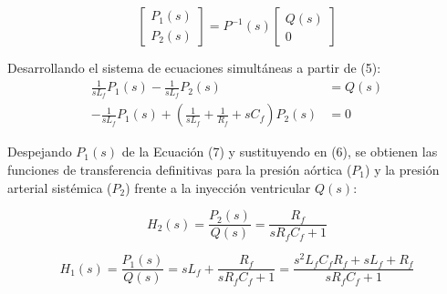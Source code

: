 \documentclass[journal,10pt]{IEEEtran}
\begin{document}
\begin{equation}
\begin{bmatrix} P_1(s) \\ P_2(s) \end{bmatrix} = P^{-1}(s) \begin{bmatrix} Q(s) \\ 0 \end{bmatrix}
\end{equation}

Desarrollando el sistema de ecuaciones simultáneas a partir de (5):
\begin{align}
\frac{1}{sL_f} P_1(s) - \frac{1}{sL_f} P_2(s) &= Q(s) \\
-\frac{1}{sL_f} P_1(s) + \left(\frac{1}{sL_f} + \frac{1}{R_f} + sC_f\right) P_2(s) &= 0
\end{align}

Despejando $P_1(s)$ de la Ecuación (7) y sustituyendo en (6), se obtienen las funciones de transferencia definitivas para la presión aórtica ($P_1$) y la presión arterial sistémica ($P_2$) frente a la inyección ventricular $Q(s)$:

\begin{equation}
H_2(s) = \frac{P_2(s)}{Q(s)} = \frac{R_f}{s R_f C_f + 1}
\end{equation}

\begin{equation}
H_1(s) = \frac{P_1(s)}{Q(s)} = sL_f + \frac{R_f}{s R_f C_f + 1} = \frac{s^2 L_f C_f R_f + sL_f + R_f}{s R_f C_f + 1}
\end{equation}



\end{document}
